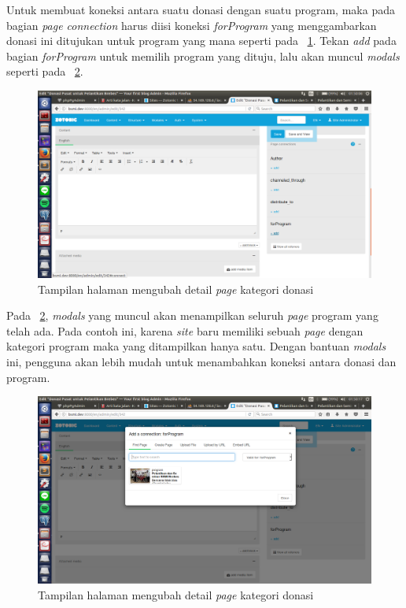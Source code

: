 Untuk membuat koneksi antara suatu donasi dengan suatu program, maka pada bagian \textit{page connection} harus diisi koneksi \textit{forProgram} yang menggambarkan donasi ini ditujukan untuk program yang mana seperti pada \pic~\ref{fig:editdonation3}. Tekan \textit{add} pada bagian \textit{forProgram} untuk memilih program yang dituju, lalu akan muncul \textit{modals} seperti pada \pic~\ref{fig:editdonation4}.
\begin{figure}
	\centering
	\includegraphics[width=1\textwidth]
	{pics/9-editDonation3.png}
	\caption{Tampilan halaman mengubah detail \textit{page} kategori donasi}
	\label{fig:editdonation3}
\end{figure}
\vspace{-0.3cm}

Pada \pic~\ref{fig:editdonation4}, \textit{modals} yang muncul akan menampilkan seluruh \textit{page} program yang telah ada. Pada contoh ini, karena \textit{site} baru memiliki sebuah \textit{page} dengan kategori program maka yang ditampilkan hanya satu. Dengan bantuan \textit{modals} ini, pengguna akan lebih mudah untuk menambahkan koneksi antara donasi dan program.
\begin{figure}
	\centering
	\includegraphics[width=1\textwidth]
	{pics/10-editDonation4.png}
	\caption{Tampilan halaman mengubah detail \textit{page} kategori donasi}
	\label{fig:editdonation4}
\end{figure}
\vspace{-0.3cm}

